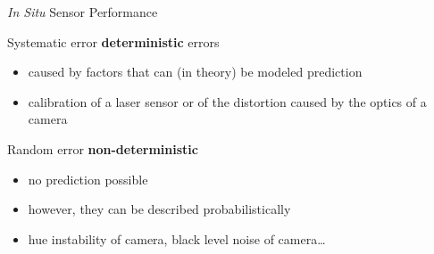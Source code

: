 \documentclass[compress]{beamer}
\begin{document}
\begin{frame}{\emph{In Situ} Sensor Performance}


    Systematic error \Rightarrow \textbf{deterministic} errors

    \begin{itemize}
        \item
              caused by factors that can (in theory) be modeled \rightarrow
              prediction
        \item
              \eg calibration of a laser sensor or of the distortion caused by the
              optics of a camera
    \end{itemize}

    Random error \Rightarrow \textbf{non-deterministic}

    \begin{itemize}

        \item
              no prediction possible
        \item
              however, they can be described probabilistically
        \item
              \eg hue instability of camera, black level noise of camera\ldots
    \end{itemize}

\end{frame}
\end{document}
